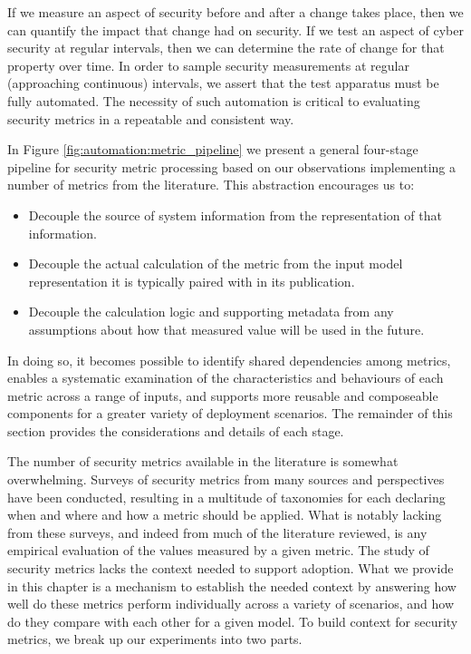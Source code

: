 

If we measure an aspect of security before and after a change takes place, then we can quantify the impact that change had on security. If we test an aspect of cyber security at regular intervals, then we can determine the rate of change for that property over time. In order to sample security measurements at regular (approaching continuous) intervals, we assert that the test apparatus must be fully automated. The necessity of such automation is critical to evaluating security metrics in a repeatable and consistent way. 


In Figure \ref{fig:automation:metric_pipeline} we present a general four-stage pipeline for security metric processing based on our observations implementing a number of metrics from the literature. This abstraction encourages us to:
\begin{itemize}
\item Decouple the source of system information from the representation of that information. 
\item Decouple the actual calculation of the metric from the input model representation it is typically paired with in its publication. 
\item Decouple the calculation logic and supporting metadata from any assumptions about how that measured value will be used in the future. 
\end{itemize}

In doing so, it becomes possible to identify shared dependencies among metrics, enables a systematic examination of the characteristics and behaviours of each metric across a range of inputs, and supports more reusable and composeable components for a greater variety of deployment scenarios. The remainder of this section provides the considerations and details of each stage.

The number of security metrics available in the literature is somewhat overwhelming. Surveys of security metrics from many\cite{Bohme_Nowey_2008, Haque_Keffeler_Atkison_2017, Hecker_2008, Kordy_2013, Kundu_Ghosh_Chokshi_Ghosh_2012, Pendleton_Garcia-Lebron_Cho_Xu_2016, Ramos_Lazar_Filho_Rodrigues_2017, Rudolph_Schwarz_2012, Savola_2007, Tavallaee_Stakhanova_Ghorbani_2010, Verendel_2009,  Wagner_Eckhoff_2015} sources and perspectives have been conducted, resulting in a multitude of taxonomies for each declaring when and where and how a metric should be applied.  What is notably lacking from these surveys, and indeed from much of the literature reviewed, is any empirical evaluation of the values measured by a given metric. The study of security metrics lacks the context needed to support adoption. What we provide in this chapter is a mechanism to establish the needed context by answering how well do these metrics perform individually across a variety of scenarios, and how do they compare with each other for a given model. To build context for security metrics, we break up our experiments into two parts. 


